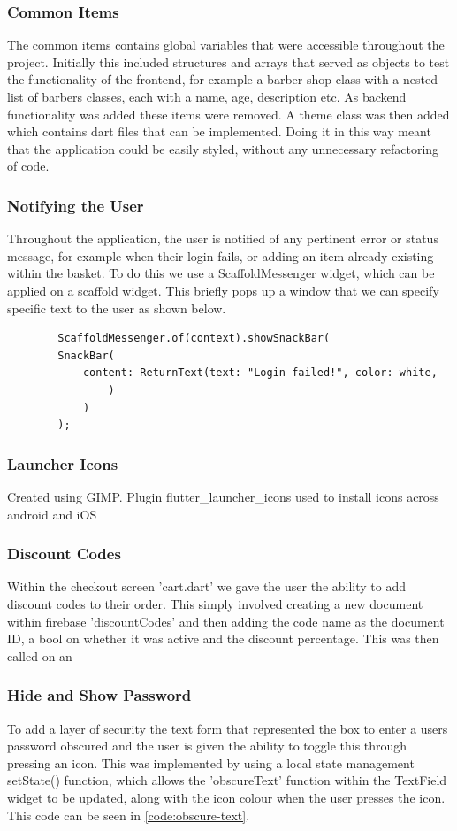 \documentclass[12pt]{article}
\begin{document}
	\subsubsection{Common Items}
	The common items contains global variables that were accessible throughout the project. Initially this included structures and arrays that served as objects to test the functionality of the frontend, for example a barber shop class with a nested list of barbers classes, each with a name, age, description etc. As backend functionality was added these items were removed. A theme class was then added which contains dart files that can be implemented. Doing it in this way meant that the application could be easily styled, without any unnecessary refactoring of code.
	
	\subsubsection{Notifying the User}
	Throughout the application, the user is notified of any pertinent error or status message, for example when their login fails, or adding an item already existing within the basket. To do this we use a ScaffoldMessenger widget, which can be applied on a scaffold widget. This briefly pops up a window that we can specify specific text to the user as shown below.
	\begin{verbatim}
		ScaffoldMessenger.of(context).showSnackBar(
		SnackBar(
			content: ReturnText(text: "Login failed!", color: white,
				)
			)
		);
	\end{verbatim} 
	
	
	\subsubsection{Launcher Icons}
	\label{launcher-icons}
	Created using GIMP. Plugin flutter\_launcher\_icons used to install icons across android and iOS
	
	\subsubsection{Discount Codes}
	Within the checkout screen 'cart.dart' we gave the user the ability to add discount codes to their order. This simply involved creating a new document within firebase 'discountCodes' and then adding the code name as the document ID, a bool on whether it was active and the discount percentage. This was then called on an
	
	\subsubsection{Hide and Show Password}
	To add a layer of security the text form that represented the box to enter a users password obscured and the user is given the ability to toggle this through pressing an icon. This was implemented by using a local state management setState() function, which allows the 'obscureText' function within the TextField widget to be updated, along with the icon colour when the user presses the icon. This code can be seen in \autoref{code:obscure-text}.
	
\end{document}
